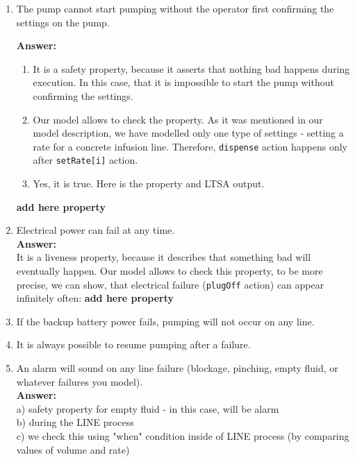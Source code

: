 \documentclass{article}
\begin{document}
\begin{enumerate}
    \item The pump cannot start pumping without the operator first confirming the settings on the pump.
    
    \textbf{Answer:}
    \begin{enumerate}
    \item It is a safety property, because it asserts that nothing bad happens during execution. In this case, that it is impossible to start the pump without confirming the settings.
    \item  Our model allows to check the property. As it was mentioned in our model description, we have modelled only one type of settings - setting a rate for a concrete infusion line. Therefore, \verb|dispense| action happens only after \verb|setRate[i]| action.
    \item Yes, it is true. Here is the property and LTSA output.
    
    \end{enumerate}
    
    \textbf{add here property}
    
    \item Electrical power can fail at any time.\\
    \textbf{Answer:}\\
    It is a liveness property, because it describes that something bad will eventually happen. Our model allows to check this property, to be more precise, we can show, that electrical failure (\verb|plugOff| action) can appear infinitely often:
     \textbf{add here property}
      
    
    \item If the backup battery power fails, pumping will not occur on any line.
    \item It is always possible to resume pumping after a failure.
    \item An alarm will sound on any line failure (blockage, pinching, empty fluid, or
whatever failures you model).\\
    \textbf{Answer:}
\\
a) safety property for empty fluid - in this case, will be alarm\\
b) during the LINE process\\
c) we check this using "when" condition inside of LINE process (by comparing values of volume and rate)



\end{enumerate}
\end{document}
